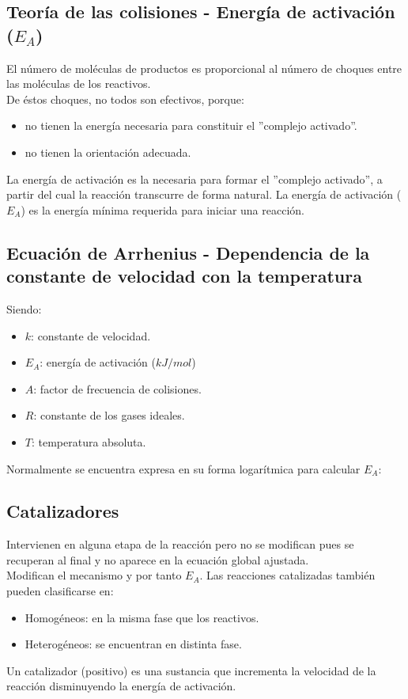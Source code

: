         \subsection{Teoría de las colisiones - Energía de activación ($E_A$)}
    \sangria{} El número de moléculas de productos es proporcional al número de choques entre las moléculas de los reactivos. \\ \sangria{} De éstos choques, no todos son efectivos, porque: \begin{itemize} \item no tienen la energía necesaria para constituir el ''complejo activado''. \item no tienen la orientación adecuada. \end{itemize} \sangria{} La energía de activación es la necesaria para formar el ''complejo activado'', a partir del cual la reacción transcurre de forma natural.    \sangria{} La energía de activación ($E_A$) es la energía mínima requerida para iniciar una reacción.
     
    \subsection{Ecuación de Arrhenius - Dependencia de la constante de velocidad con la temperatura}
 \saltoPag{} Siendo: \begin{itemize} \item $k$: constante de velocidad. \item $E_A$: energía de activación ($kJ/mol$) \item $A$: factor de frecuencia de colisiones. \item $R$: constante de los gases ideales. \item $T$: temperatura absoluta. \end{itemize} Normalmente se encuentra expresa en su forma logarítmica para calcular $E_A$:  
    \subsection{Catalizadores}
\sangria{} Intervienen en alguna etapa de la reacción pero no se modifican pues se recuperan al final y no aparece en la ecuación global ajustada. \\ \sangria{} Modifican el mecanismo y por tanto $E_A$. \sangria{} Las reacciones catalizadas también pueden clasificarse en: \begin{itemize} \item Homogéneos: en la misma fase que los reactivos. \item Heterogéneos: se encuentran en distinta fase. \end{itemize} \sangria{} Un catalizador (positivo) es una sustancia que incrementa la velocidad de la reacción disminuyendo la energía de activación.  
